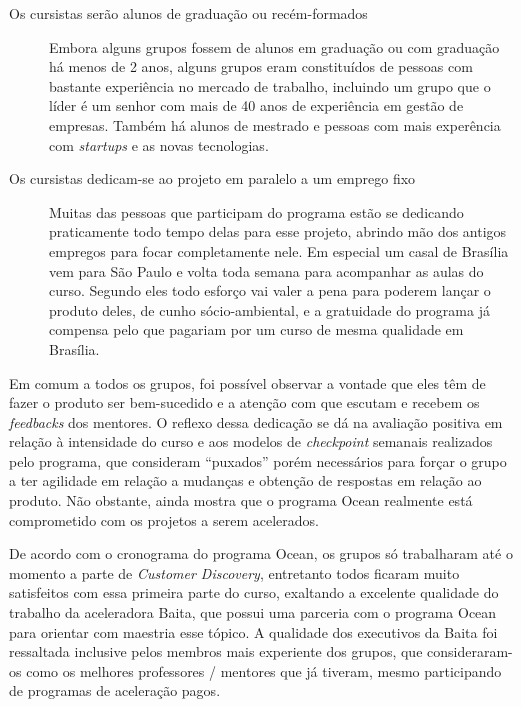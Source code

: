 \begin{description}
\item[Os cursistas serão alunos de graduação ou recém-formados] 

Embora alguns grupos fossem de alunos em graduação ou com graduação há menos de 2 anos, alguns grupos eram constituídos de pessoas com bastante experiência no mercado de trabalho, incluindo um grupo que o líder é um senhor com mais de 40 anos de experiência em gestão de empresas. Também há alunos de mestrado e pessoas com mais experência com \textit{startups} e as novas tecnologias.

\item[Os cursistas dedicam-se ao projeto em paralelo a um emprego fixo] 

Muitas das pessoas que participam do programa estão se dedicando praticamente todo tempo delas para esse projeto, abrindo mão dos antigos empregos para focar completamente nele. Em especial um casal de Brasília vem para São Paulo e volta toda semana para acompanhar as aulas do curso. Segundo eles todo esforço vai valer a pena para poderem lançar o produto deles, de cunho sócio-ambiental, e a gratuidade do programa já compensa pelo que pagariam por um curso de mesma qualidade em Brasília.

\end{description}

Em comum a todos os grupos, foi possível observar a vontade que eles têm de fazer o produto ser bem-sucedido e a atenção com que escutam e recebem os \textit{feedbacks} dos mentores. O reflexo dessa dedicação se dá na avaliação positiva em relação à intensidade do curso e aos modelos de \textit{checkpoint} semanais realizados pelo programa, que consideram \enquote{puxados}  porém necessários para forçar o grupo a ter agilidade em relação a mudanças e obtenção de respostas em relação ao produto. Não obstante, ainda mostra que o programa Ocean realmente está comprometido com os projetos a serem acelerados.

De acordo com o cronograma do programa Ocean, os grupos só trabalharam até o momento a parte de \textit{Customer Discovery}, entretanto todos ficaram muito satisfeitos com essa primeira parte do curso, exaltando a excelente qualidade do trabalho da aceleradora Baita, que possui uma parceria com o programa Ocean para orientar com maestria esse tópico. A qualidade dos executivos da Baita foi ressaltada inclusive pelos membros mais experiente dos grupos, que consideraram-os como os melhores professores / mentores que já tiveram, mesmo participando de programas de aceleração pagos.

